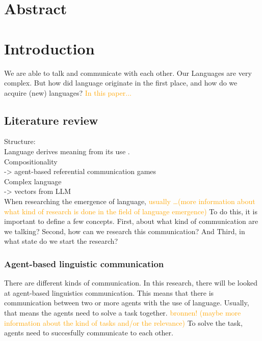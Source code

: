 \documentclass[a4paper, 12pt]{report}
\begin{document}
\setcounter{page}{1}
\pagestyle{plain} 

\chapter*{Abstract}

\tableofcontents


\chapter{Introduction}

\noindent We are able to talk and communicate with each other. 
Our Languages are very complex. 
But how did language originate in the first place, and how do we acquire (new) languages? 
\textcolor{orange}{In this paper...}

\section{Literature review}
Structure: \\
Language derives meaning from its use \cite{Wittgenstein}. \\
Compositionality \\
-> agent-based referential communication games \\
Complex language \\
-> vectors from LLM \\

When researching the emergence of language, \textcolor{orange}{usually \dots (more information about what kind of research is done in the field of language emergence)}
To do this, it is important to define a few concepts. 
First, about what kind of communication are we talking?
Second, how can we research this communication? 
And Third, in what state do we start the research?

\subsection{Agent-based linguistic communication}
There are different kinds of communication.
In this research, there will be looked at agent-based linguistics communication. 
This means that there is communication between two or more agents with the use of language. 
Usually, that means the agents need to solve a task together. 
\textcolor{orange}{bronnen! (maybe more information about the kind of tasks and/or the relevance)} 
To solve the task, agents need to succesfully communicate to each other. 
\end{document}
